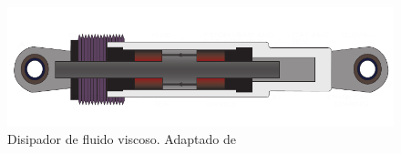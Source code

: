 	\begin{figure}[!h]
	\centering
		\includegraphics[scale=1]{E_IMAGENES/1_Capitulo2/Cap2_Imagen2.pdf}
	\caption[Disipador de fluido viscoso]{\centering\footnotesize Disipador de fluido viscoso.  Adaptado de \citet{Taylor2019}}
	\label{Cap2_Figura2}
	\end{figure}
	
	
	
	

